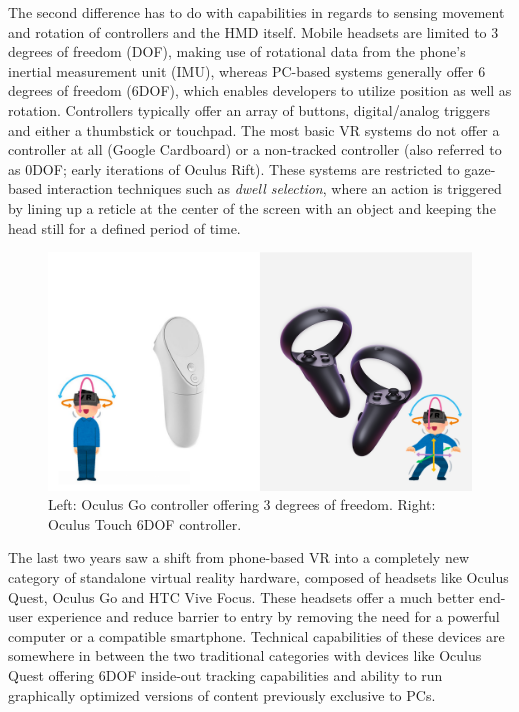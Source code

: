 \documentclass[thesis=M,english,hidelinks]{FITthesisXE}[2012/06/26]
\begin{document}
The second difference has to do with capabilities in regards to sensing movement and rotation of controllers and the HMD itself. Mobile headsets are limited to 3 degrees of freedom (DOF), making use of rotational data from the phone's inertial measurement unit (IMU), whereas PC-based systems generally offer 6 degrees of freedom (6DOF), which enables developers to utilize position as well as rotation. Controllers typically offer an array of buttons, digital/analog triggers and either a thumbstick or touchpad. The most basic VR systems do not offer a controller at all (Google Cardboard) or a non-tracked controller (also referred to as 0DOF; early iterations of Oculus Rift). These systems are restricted to gaze-based interaction techniques such as \emph{dwell selection}, where an action is triggered by lining up a reticle at the center of the screen with an object and keeping the head still for a defined period of time.\autocite{bookofvr}

\begin{figure}[ht]
\centering
\includegraphics[scale=0.2]{dof_explanation}
\caption{Left: Oculus Go controller offering 3 degrees of freedom. Right: Oculus Touch 6DOF controller.\autocite{dofexplanation}}
\label{fig:dof_explanation}
\end{figure}

The last two years saw a shift from phone-based VR into a completely new category of standalone virtual reality hardware, composed of headsets like Oculus Quest\autocite{quest}, Oculus Go\autocite{go} and HTC Vive Focus\autocite{vivefocus}. These headsets offer a much better end-user experience and reduce barrier to entry by removing the need for a powerful computer or a compatible smartphone. Technical capabilities of these devices are somewhere in between the two traditional categories with devices like Oculus Quest offering 6DOF inside-out tracking capabilities and ability to run graphically optimized versions of content previously exclusive to PCs.
\end{document}
